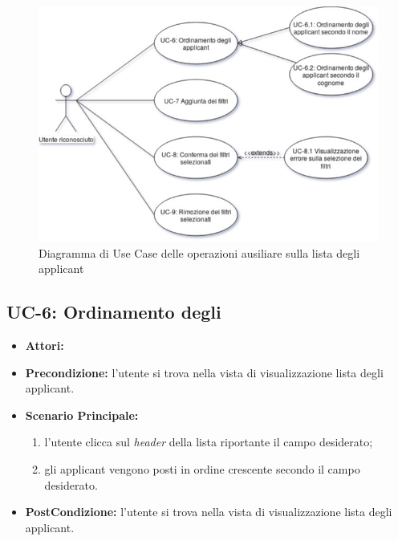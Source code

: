 \vspace{0.5em}
\begin{figure}[!h]
	\centering 
	\includegraphics[width=1\columnwidth]{immagini/usecase/UC2} 
	\caption{Diagramma di Use Case delle operazioni ausiliare sulla lista degli applicant}
	\label{figura:uc-2}
\end{figure}

\subsection{UC-6: Ordinamento degli\applicant}
\begin{itemize}
	\item \textbf{Attori:}\loggedusr
	\item \textbf{Precondizione:} l'utente si trova nella vista di visualizzazione lista degli applicant.
	\item \textbf{Scenario Principale:}
	\begin{enumerate}
		\item l'utente clicca sul \textit{header} della lista riportante il campo desiderato;
		\item gli applicant vengono posti in ordine crescente secondo il campo desiderato.
	\end{enumerate}
	\item \textbf{PostCondizione:}  l'utente si trova nella vista di visualizzazione lista degli applicant.
\end{itemize}


